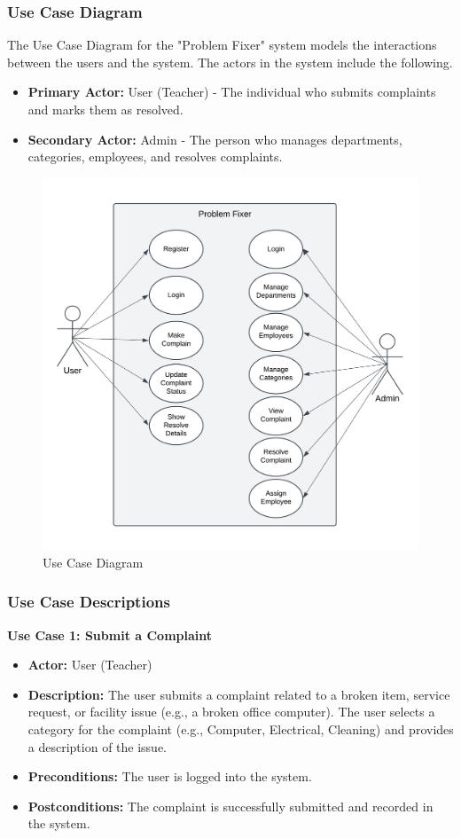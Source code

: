 \documentclass[a4paper,12pt]{article}
\begin{document}
\subsubsection{Use Case Diagram}
The Use Case Diagram for the "Problem Fixer" system models the interactions between the users and the system. The actors in the system include the following.

\begin{itemize}
    \item \textbf{Primary Actor:} User (Teacher) - The individual who submits complaints and marks them as resolved.
    \item \textbf{Secondary Actor:} Admin - The person who manages departments, categories, employees, and resolves complaints.
\end{itemize}
\begin{figure}[H]
    \centering
    \includegraphics[width=0.85\linewidth]{photos/use-case.png}

    \caption{Use Case Diagram}
    \label{fig:enter-label}
\end{figure}



\subsubsection{Use Case Descriptions}


\textbf{Use Case 1: Submit a Complaint} 
    \begin{itemize}
        \item \textbf{Actor:} User (Teacher)
        \item \textbf{Description:} The user submits a complaint related to a broken item, service request, or facility issue (e.g., a broken office computer). The user selects a category for the complaint (e.g., Computer, Electrical, Cleaning) and provides a description of the issue.
        \item \textbf{Preconditions:} The user is logged into the system.
        \item \textbf{Postconditions:} The complaint is successfully submitted and recorded in the system.
    \end{itemize} 
\end{document}
